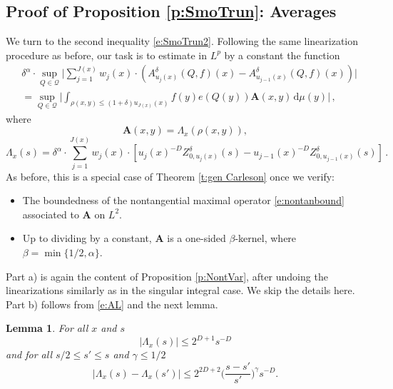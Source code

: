 \documentclass[12pt,reqno,a4paper,dvipsnames]{amsart}
\theoremstyle{plain}
\newtheorem{lemma}[theorem]{Lemma}
\theoremstyle{definition}
\numberwithin{theorem}{section}
\numberwithin{equation}{section}
\newcommand{\AD}{D}
\begin{document}
    \subsection{Proof of Proposition \ref{p:SmoTrun}: Averages} 
    We turn to the second inequality \eqref{e:SmoTrun2}. Following the same linearization procedure as before, our task is to estimate in $L^p$ by a constant the function
    \begin{align*}
        &\delta^{\alpha} \cdot \sup_{Q \in \mathcal{Q}} \Big| \sum_{j=1}^{J(x)} w_j(x) \cdot (A^\delta_{u_j(x)}(Q, f)(x) - A^\delta_{u_{j-1}(x)}(Q, f)(x)) \Big|\\
        &= \sup_{Q \in \mathcal{Q}} \Big|\int_{\rho(x,y) \le (1+\delta)u_{J(x)}(x)} f(y) e(Q(y)) \mathbf{A}(x,y) \, \mathrm{d}\mu(y)\Big|\,,
    \end{align*}
    where
    \begin{equation}
        \label{e:AL}
        \mathbf{A}(x,y) = \Lambda_x(\rho(x,y)),
    \end{equation}
    \[
        \Lambda_x(s) = \delta^{\alpha} \cdot \sum_{j=1}^{J(x)} w_j(x)\cdot [ u_{j}(x)^{-\AD} Z_{0,u_j(x)}^{\delta}(s) -  u_{j-1}(x)^{-\AD} Z_{0,u_{j-1}(x)}^{\delta}(s)]\,.
    \]
    As before, this is a special case of Theorem \ref{t:gen Carleson} once we verify: 
    \begin{itemize}
        \item[a)] The boundedness of the nontangential maximal operator \eqref{e:nontanbound} associated to $\mathbf{A}$ on $L^2$.
        \item[b)] Up to dividing by a constant, $\mathbf{A}$ is a one-sided $\beta$-kernel, where $\beta = \min\{1/2, \alpha\}$.
    \end{itemize}  
    Part a) is again the content of Proposition \ref{p:NontVar}, after undoing the linearizations similarly as in the singular integral case. We skip the details here. Part b) follows from \eqref{e:AL} and the next lemma. 
    \begin{lemma}
        For all $x$ and $s$
        \begin{equation}
            \label{e:ba_upper}
            |\Lambda_x(s)| \le 2^{\AD + 1} s^{-\AD}
        \end{equation}
        and for all $s/2 \le s' \le s$ and $\gamma \le 1/2$
        \begin{equation}
            \label{e:ba_hol}
            |\Lambda_x(s) - \Lambda_x(s')| \le 2^{2\AD + 2} \Big( \frac{s - s'}{s'} \Big)^\gamma  s^{-\AD}.
        \end{equation}
    \end{lemma}
    
\end{document}
